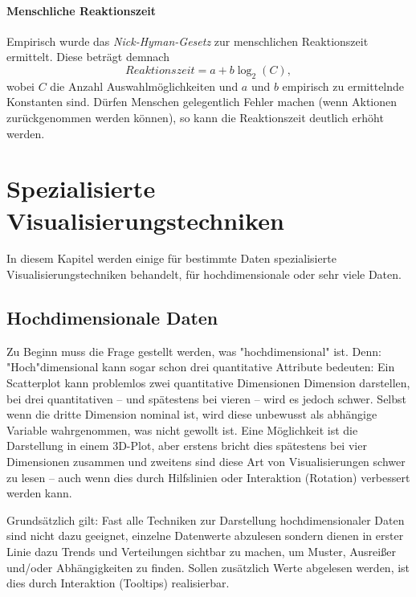 			\subsubsection{Menschliche Reaktionszeit}
				Empirisch wurde das \emph{Nick-Hyman-Gesetz} zur menschlichen Reaktionszeit ermittelt. Diese beträgt demnach
				\begin{equation}
					\mathit{Reaktionszeit} = a + b \log_2(C),
				\end{equation}
				wobei \(C\) die Anzahl Auswahlmöglichkeiten und \(a\) und \(b\) empirisch zu ermittelnde Konstanten sind. Dürfen Menschen gelegentlich Fehler machen (\zB wenn Aktionen zurückgenommen werden können), so kann die Reaktionszeit deutlich erhöht werden.

\chapter{Spezialisierte Visualisierungstechniken}
In diesem Kapitel werden einige für bestimmte Daten spezialisierte Visualisierungstechniken behandelt, \bspw für hochdimensionale oder sehr viele Daten.

\section{Hochdimensionale Daten}
\label{sec:highdim}

Zu Beginn muss die Frage gestellt werden, was "hochdimensional" ist. Denn: "Hoch"dimensional kann sogar schon drei quantitative Attribute bedeuten: Ein Scatterplot kann \bspw problemlos zwei quantitative Dimensionen Dimension darstellen, bei drei quantitativen -- und spätestens bei vieren -- wird es jedoch schwer. Selbst wenn die dritte Dimension nominal ist, wird diese unbewusst als abhängige Variable wahrgenommen, was \ggf nicht gewollt ist. Eine Möglichkeit ist die Darstellung in einem 3D-Plot, aber erstens bricht dies spätestens bei vier Dimensionen zusammen und zweitens sind diese Art von Visualisierungen schwer zu lesen -- auch wenn dies durch Hilfslinien oder Interaktion (\bspw Rotation) verbessert werden kann.

Grundsätzlich gilt: Fast alle Techniken zur Darstellung hochdimensionaler Daten sind nicht dazu geeignet, einzelne Datenwerte abzulesen sondern dienen in erster Linie dazu Trends und Verteilungen sichtbar zu machen, um Muster, Ausreißer und/oder Abhängigkeiten zu finden. Sollen zusätzlich Werte abgelesen werden, ist dies durch Interaktion (\zB Tooltips) realisierbar.

